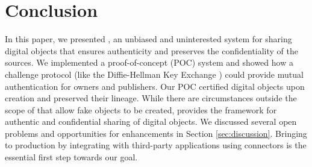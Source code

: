 \section{Conclusion}
\label{sec:conclusion}

In this paper, we presented \name, an unbiased and uninterested system for sharing digital objects that ensures authenticity and preserves the confidentiality of the sources. We implemented a proof-of-concept (POC) system and showed how a challenge protocol (like the Diffie-Hellman Key Exchange \cite{dh-key-exchange}) could provide mutual authentication for owners and publishers. Our POC certified digital objects upon creation and preserved their lineage. While there are circumstances outside the scope of \name that allow fake objects to be created, \name provides the framework for authentic and confidential sharing of digital objects. We discussed several open problems and opportunities for enhancements in Section \ref{sec:discussion}. Bringing \name to production by integrating with third-party applications using connectors is the essential first step towards our goal. 
